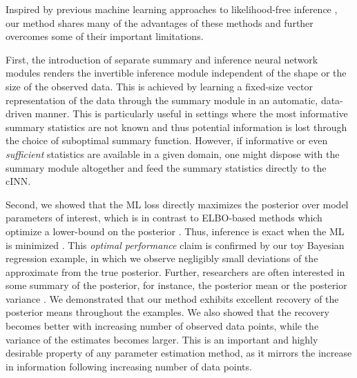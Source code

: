 \documentclass[9pt,twoside,lineno]{pnas-new}
\begin{document}
Inspired by previous machine learning approaches to likelihood-free inference \cite{radev2019towards, hwang2018conditional, mestdagh2018prepaid, raynal2018abc, jiang2017learning, lueckmann2017flexible, papamakarios2016fast}, our method shares many of the advantages of these methods and further overcomes some of their important limitations. 

First, the introduction of separate summary and inference neural network modules renders the invertible inference module independent of the shape or the size of the observed data. This is achieved by learning a fixed-size vector representation of the data through the summary module in an automatic, data-driven manner. This is particularly useful in settings where the most informative summary statistics are not known and thus potential information is lost through the choice of suboptimal summary function. However, if informative or even \textit{sufficient} statistics are available in a given domain, one might dispose with the summary module altogether and feed the summary statistics directly to the cINN. 

Second, we showed that the ML loss directly maximizes the posterior over model parameters of interest, which is in contrast to ELBO-based methods which optimize a lower-bound on the posterior \cite{papamakarios2016fast, kingma2014auto}. Thus, inference is exact when the ML is minimized \cite{kingma2018glow, dinh2016density}. This \textit{optimal performance} claim is confirmed by our toy Bayesian regression example, in which we observe negligibly small deviations of the approximate from the true posterior. Further, researchers are often interested in some summary of the posterior, for instance, the posterior mean or the posterior variance \cite{radev2019towards, raynal2018abc}. We demonstrated that our method exhibits excellent recovery of the posterior means throughout the examples. We also showed that the recovery becomes better with increasing number of observed data points, while the variance of the estimates becomes larger. This is an important and highly desirable property of any parameter estimation method, as it mirrors the increase in information following increasing number of data points. 
\end{document}
